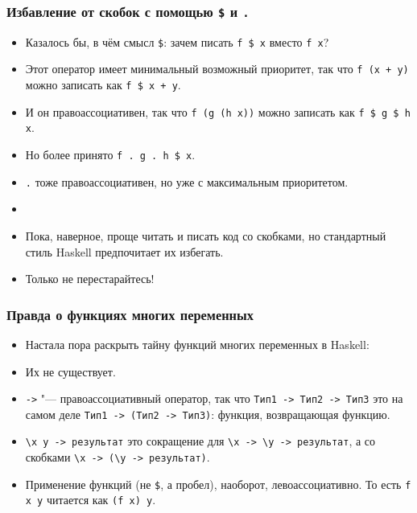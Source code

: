 \documentclass[10pt]{beamer}
\begin{document}
\begin{frame}[fragile]
\frametitle{Избавление от скобок с помощью \lstinline|$| и \lstinline|.|}
\begin{itemize}
    \item Казалось бы, в чём смысл \lstinline|$|: зачем писать \lstinline|f $ x| вместо \lstinline|f x|?\pause
    \item Этот оператор имеет минимальный возможный приоритет, так что \lstinline|f (x + y)| можно записать как \lstinline|f $ x + y|.\pause
    \item И он правоассоциативен, так что \lstinline|f (g (h x))| можно записать как \lstinline|f $ g $ h x|.\pause
    \item Но более принято \lstinline|f . g . h $ x|.\pause
    \item \lstinline|.| тоже правоассоциативен, но уже с максимальным приоритетом.\pause
    \item[]
    \item Пока, наверное, проще читать и писать код со скобками, но стандартный стиль Haskell предпочитает их избегать.
    \item Только не перестарайтесь!
\end{itemize}
\end{frame}

\begin{frame}[fragile]
\frametitle{Правда о функциях многих переменных}
\begin{itemize}
    \item Настала пора раскрыть тайну функций многих переменных в Haskell:\pause
    \item Их не существует.\pause
    \item \lstinline|->| "--- правоассоциативный оператор, так что \lstinline|Тип1 -> Тип2 -> Тип3| это на самом деле \lstinline|Тип1 -> (Тип2 -> Тип3)|: функция, возвращающая функцию.\pause
    \item \lstinline|\x y -> результат| это сокращение для \lstinline|\x -> \y -> результат|, а со скобками \lstinline|\x -> (\y -> результат)|.\pause
    \item Применение функций (не \lstinline|$|, а пробел), наоборот, левоассоциативно. То есть \lstinline|f x y| читается как \lstinline|(f x) y|.
\end{itemize}
\end{frame}
\end{document}
